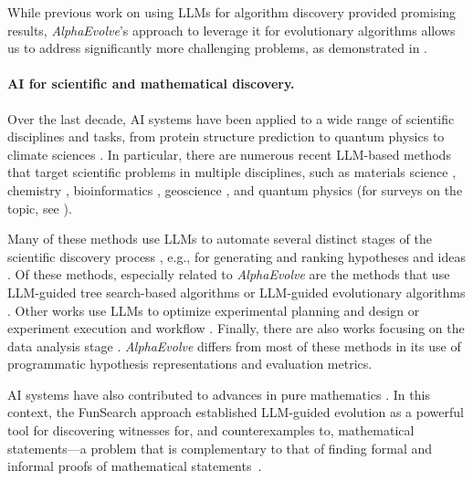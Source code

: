 \documentclass[logo,copyright,12pt]{googledeepmind}
\theoremstyle{definition}
\theoremstyle{remark}
\theoremstyle{plain}
\newcommand{\method}{\emph{AlphaEvolve}\xspace}
\begin{document}
While previous work on using LLMs for algorithm discovery provided promising results, \method's approach to leverage it for evolutionary algorithms allows us to address significantly more challenging problems, as demonstrated in .

\paragraph{AI for scientific and mathematical discovery.}
Over the last decade, AI systems have been applied to a wide range of scientific disciplines and tasks, from protein structure prediction \citep{jumper2021highly} to quantum physics \citep{bausch2024learning,ruiz2025quantum} to climate sciences \citep{lam2023learning}.
In particular, there are numerous recent LLM-based methods that target scientific problems in multiple disciplines, such as materials science \citep{miret2024llms,zhang2024honeycomb,jia2024llmatdesign,song2025llmfeynman}, chemistry \citep{caldasramos2025review,luo2025leveraging}, bioinformatics \citep{sarumi2024large,madani2023large}, geoscience \citep{pantiukhin2025accelerating}, and quantum physics \citep{frohnert2025discovering,pan2025quantum} (for surveys on the topic, see \citep{gridach2025agentic,luo2025llm4sr,ren2025towards}).

Many of these methods use LLMs to automate several distinct stages of the scientific discovery process \citep{wang2024scimon,xia2025nature,li2025large,gu2024interesting,yang2024large}, e.g., for generating and ranking hypotheses and ideas \citep{guo2024embracing,si2025canllms}.
Of these methods, especially related to \method are the methods that use LLM-guided tree search-based algorithms \citep{bran2025chemical} or LLM-guided evolutionary algorithms \cite{yang2025moosechem,zhou2024hypothesis,gottweis2025towards}.
Other works use LLMs to optimize experimental planning and design \citep{huang2024crisprgpt,bran2024augmenting,boiko2023autonomous,naumov2025dora} or experiment execution and workflow \citep{wang2025efficient,rives2021biological,lin2023evolutionary,ye2023drugassist,ferruz2022controllable}.
Finally, there are also works focusing on the data analysis stage \citep{rasheed2024canlarge}.
\method differs from most of these methods in its use of programmatic hypothesis representations and evaluation metrics.

AI systems have also contributed to advances in pure mathematics \citep{davies2021advancing}.
In this context, the FunSearch approach \citep{paredes2023mathematical,ellenberg2025generative} established LLM-guided evolution as a powerful tool for discovering witnesses for, and counterexamples to, mathematical statements---a problem that is complementary to that of finding formal and informal proofs of mathematical statements~\citep{trinh2024solving,hubert2024ai,yang2024formal,yang2023leandojo,thakur2024context,collins2024evaluating}.
\end{document}
